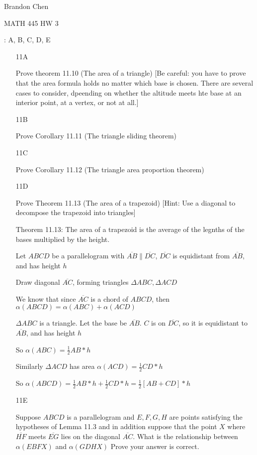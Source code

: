 \documentclass[11pt]{article}
\newcommand{\segment}[1]{\overline{#1}}
\begin{document}
\noindent Brandon Chen

\noindent MATH 445 HW 3

: A, B, C, D, E

\begin{itemize}

	\item[11A]
		
		Prove theorem 11.10 (The area of a triangle) [Be careful: you have to prove that the area formula holds no matter which base is chosen. There are several cases to consider, dpeending on whether the altitude meets hte base at an interior point, at a vertex, or not at all.]

	\item[11B]

		Prove Corollary 11.11 (The triangle sliding theorem)

	\item[11C]

		Prove Corollary 11.12 (The triangle area proportion theorem)



	\item[11D]

		Prove Theorem 11.13 (The area of a trapezoid) [Hint: Use a diagonal to decompose the trapezoid into triangles]

		Theorem 11.13: The area of a trapezoid is the average of the legnths of the bases multiplied by the height.

		Let $ABCD$ be a parallelogram with $\segment{AB} \parallel \segment{DC}$, $\segment{DC}$ is equidistant from $\segment{AB}$, and has height $h$

		Draw diagonal $\segment{AC}$, forming triangles $\Delta ABC, \Delta ACD$

		We know that since $\segment{AC}$ is a chord of $ABCD$, then $\alpha(ABCD) = \alpha(ABC) + \alpha(ACD)$

		$\Delta ABC$ is a triangle. Let the base be $\segment{AB}$. $C$ is on $\segment{DC}$, so it is equidistant to $\segment{AB}$, and has height $h$

		So $\alpha(ABC) = \frac{1}{2}AB*h$

		Similarly $\Delta ACD$ has area $\alpha(ACD) = \frac{1}{2}CD*h$

		So $\alpha(ABCD) = \frac{1}{2}AB*h + \frac{1}{2}CD*h = \frac{1}{2}[AB + CD]*h$

	\item[11E]

		Suppose $ABCD$ is a parallelogram and $E,F,G,H$ are points satisfying the hypotheses of Lemma 11.3 and in addition suppose that the point $X$ where $\segment{HF}$ meets $\segment{EG}$ lies on the diagonal $\segment{AC}$. What is the relationship between $\alpha(EBFX)$ and $\alpha(GDHX)$ Prove your answer is correct.


\end{itemize}
\end{document}
